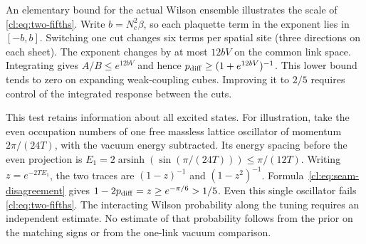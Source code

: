 An elementary bound for the actual Wilson ensemble illustrates the scale
of \eqref{cl:eq:two-fifths}. Write $b=N_c^2\beta$, so each plaquette
term in the exponent lies in $[-b,b]$. Switching one cut changes six
terms per spatial site (three directions on each sheet). The exponent
changes by at most $12bV$ on the common link space. Integrating gives
$A/B\le e^{12bV}$ and hence $p_{\rm diff}\ge(1+e^{12bV})^{-1}$.
This lower bound tends to zero on expanding weak-coupling cubes.
Improving it to $2/5$ requires control of the integrated response
between the cuts.

This test retains information about all excited states. For illustration,
take the even occupation numbers of one free massless lattice oscillator
of momentum $2\pi/(24T)$, with the vacuum energy subtracted. Its energy
spacing before the even projection is
$E_1=2\operatorname{arsinh}(\sin(\pi/(24T)))\le\pi/(12T)$.
Writing $z=e^{-2TE_1}$, the two traces are $(1-z)^{-1}$ and
$(1-z^2)^{-1}$. Formula~\eqref{cl:eq:seam-disagreement} gives
$1-2p_{\rm diff}=z\ge e^{-\pi/6}>1/5$. Even this single oscillator
fails \eqref{cl:eq:two-fifths}. The interacting Wilson probability along
the tuning requires an independent estimate. No estimate of that
probability follows from the prior on the matching signs or from the
one-link vacuum comparison.
